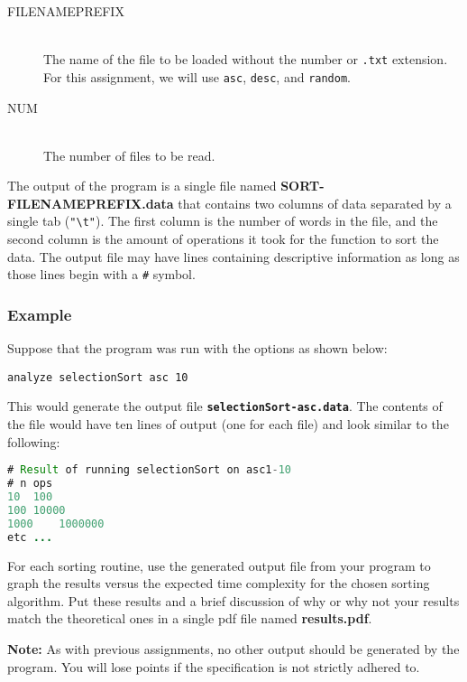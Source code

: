 \documentclass{article}
\begin{document}
\begin{spacing}{1.1}
\begin{enumerate}[leftmargin=*, resume]
\begin{description}
\item[FILENAMEPREFIX] \hfill \\ The name of the file to be loaded without the
  number or \texttt{.txt} extension.  For this assignment, we will use \lstinline$asc$,
  \lstinline$desc$, and \lstinline$random$.

\item[NUM] \hfill \\ The number of files to be read.

\end{description}

The output of the program is a single file named
\textbf{SORT-FILENAMEPREFIX.data} that contains two columns of data
separated by a single tab (\lstinline$"\t"$).  The first column is the
number of words in the file, and the second column is the amount of
operations it took for the function to sort the data.  The output file
may have lines containing descriptive information as long as those
lines begin with a \texttt{\#} symbol.

\subsubsection*{Example}

Suppose that the program was run with the options as shown below:

\begin{verbatim}
analyze selectionSort asc 10
\end{verbatim}

This would generate the output file
\textbf{\texttt{selectionSort-asc.data}}.  The contents of the file
would have ten lines of output (one for each file) and look similar to
the following:

\begin{lstlisting}[language=java,numbers=none]
# Result of running selectionSort on asc1-10
# n	ops
10	100
100	10000
1000	1000000
etc ...
\end{lstlisting}

For each sorting routine, use the generated output file from your
program to graph the results versus the expected time
complexity for the chosen sorting algorithm. Put these results and a
brief discussion of why or why not your results match the theoretical
ones in a single pdf file named \textbf{results.pdf}.

\textbf{Note:} As with previous assignments, no other output should be
generated by the program.  You will lose points if the specification
is not strictly adhered to.


\end{enumerate}
\end{spacing}
\end{document}
